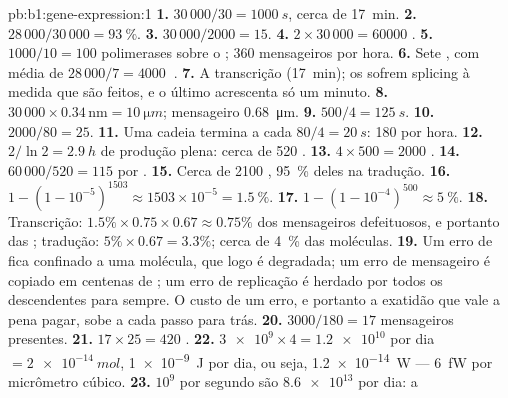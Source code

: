 \begin{solution}{pb:b1:gene-expression:1}
\textbf{1.} $30\,000/30 = \qty{1000}{s}$, cerca de \qty{17}{min}.
\textbf{2.} $28\,000/30\,000 = \qty{93}{\%}$.
\textbf{3.} $30\,000/2000 = 15$.
\textbf{4.} $2\times 30\,000 = \num{60000}$ .
\textbf{5.} $1000/10 = 100$ polimerases sobre o ; 360 mensageiros
por hora.
\textbf{6.} Sete , com média de $28\,000/7 = \qty{4000}{}$
.
\textbf{7.} A transcrição (\qty{17}{min}); os  sofrem splicing à
medida que são feitos, e o último acrescenta só um minuto.
\textbf{8.}  $30\,000\times 0.34\,\mathrm{nm} = \qty{10}{\micro m}$; mensageiro \qty{0.68}{\micro m}.
\textbf{9.} $500/4 = \qty{125}{s}$.
\textbf{10.} $2000/80 = 25$.
\textbf{11.} Uma cadeia termina a cada $80/4 = \qty{20}{s}$: 180 por
hora.
\textbf{12.} $2/\ln 2 = \qty{2.9}{h}$ de produção plena: cerca de 520
.
\textbf{13.} $4\times 500 = 2000$ .
\textbf{14.} $60\,000/520 = 115$  por .
\textbf{15.} Cerca de 2100 , \qty{95}{\%} deles na tradução.
\textbf{16.} $1 - (1 - 10^{-5})^{1503} \approx 1503\times 10^{-5} =
\qty{1.5}{\%}$.
\textbf{17.} $1 - (1 - 10^{-4})^{500} \approx \qty{5}{\%}$.
\textbf{18.} Transcrição: $1.5\%\times 0.75\times 0.67 \approx
0.75\%$ dos mensageiros defeituosos, e portanto das ;
tradução: $5\%\times 0.67 = 3.3\%$; cerca de \qty{4}{\%} das moléculas.
\textbf{19.} Um erro de  fica confinado a uma molécula, que logo
é degradada; um erro de mensageiro é copiado em centenas de ;
um erro de replicação é herdado por todos os descendentes para sempre. O
custo de um erro, e portanto a exatidão que vale a pena pagar, sobe a
cada passo para trás.
\textbf{20.} $3000/180 = 17$ mensageiros presentes.
\textbf{21.} $17\times 25 = 420$ .
\textbf{22.} $\num{3e9}\times 4 = \num{1.2e10}$  por dia
$= \qty{2e-14}{mol}$, \qty{1e-9}{J} por dia, ou seja, \qty{1.2e-14}{W}
--- \qty{6}{fW} por micrômetro cúbico.
\textbf{23.} $10^9$  por segundo são $\num{8.6e13}$ por dia: a

\end{solution}
